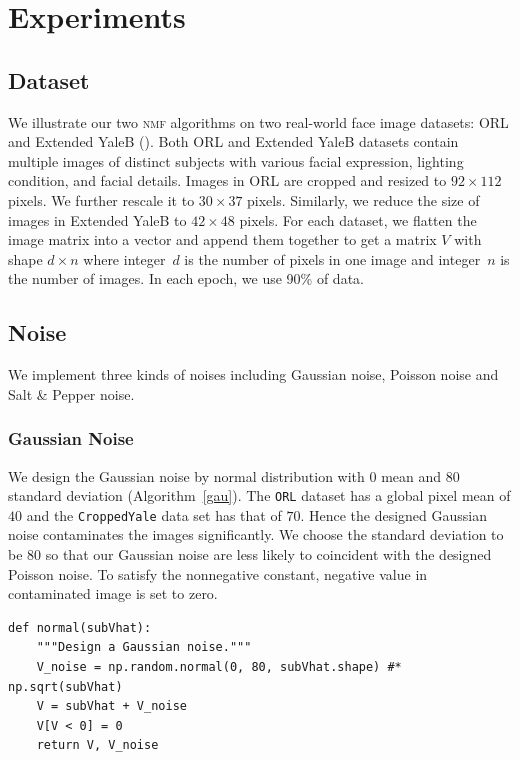 \section{Experiments}\label{chapter4}

\subsection{Dataset}
We illustrate our two \textsc{nmf} algorithms on two real-world face image datasets: ORL and Extended YaleB (\citet{belhumeur1997eigenfaces}).
Both ORL and Extended YaleB datasets contain multiple images of distinct subjects with various facial expression, lighting condition, and facial details.
Images in ORL are cropped and resized to $92 \times 112$ pixels. We further rescale it to $30 \times 37$ pixels. Similarly, we reduce the size of images in Extended YaleB to $42 \times 48$ pixels.
For each dataset, we flatten the image matrix into a vector and append them together to get a matrix $V$ with shape $d\times n$ where integer~$d$ is the number of pixels in one image and integer~$n$ is the number of images. In each epoch, we use 90\% of data.

\subsection{Noise}
We implement three kinds of noises including Gaussian noise, Poisson noise and Salt \& Pepper noise.
\subsubsection{Gaussian Noise}\label{sec:gau}
We design the Gaussian noise by normal distribution with $0$ mean and $80$ standard deviation (Algorithm~\ref{gau}). The \texttt{ORL} dataset has a global pixel mean of $40$ and the \texttt{CroppedYale} data set has that of $70$. Hence the designed Gaussian noise contaminates the images significantly. We choose the standard deviation to be $80$ so that our Gaussian noise are less likely to coincident with the designed Poisson noise. To satisfy the nonnegative constant, negative value in contaminated image is set to zero.
\begin{lstlisting}[caption= Gaussian Noise Design, label=gau]
def normal(subVhat):
    """Design a Gaussian noise."""
    V_noise = np.random.normal(0, 80, subVhat.shape) #* np.sqrt(subVhat)
    V = subVhat + V_noise
    V[V < 0] = 0
    return V, V_noise
\end{lstlisting}


